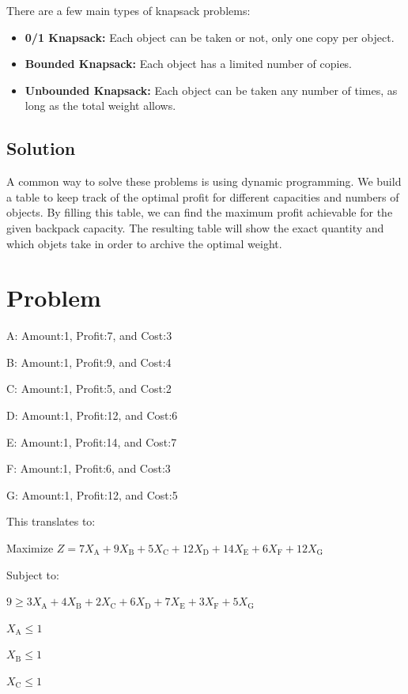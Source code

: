 \documentclass{article}
\begin{document}
There are a few main types of knapsack problems:
\begin{itemize}
  \item \textbf{0/1 Knapsack:} Each object can be taken or not, only one copy per object.
  \item \textbf{Bounded Knapsack:} Each object has a limited number of copies.
  \item \textbf{Unbounded Knapsack:} Each object can be taken any number of times, as long as the total weight allows.
\end{itemize}

\subsection{Solution}
A common way to solve these problems is using dynamic programming. We build a table to keep track of the optimal profit for different capacities and numbers of objects. By filling this table, we can find the maximum profit achievable for the given backpack capacity.
The resulting table will show the exact quantity and which objets take in order to archive the optimal weight.
\section{Problem}

A: Amount:1, Profit:7, and Cost:3

B: Amount:1, Profit:9, and Cost:4

C: Amount:1, Profit:5, and Cost:2

D: Amount:1, Profit:12, and Cost:6

E: Amount:1, Profit:14, and Cost:7

F: Amount:1, Profit:6, and Cost:3

G: Amount:1, Profit:12, and Cost:5




This translates to:

Maximize $Z = 7X_{\text{A}} + 9X_{\text{B}} + 5X_{\text{C}} + 12X_{\text{D}} + 14X_{\text{E}} + 6X_{\text{F}} + 12X_{\text{G}}$



Subject to:

$9 \geq 3X_{\text{A}} + 4X_{\text{B}} + 2X_{\text{C}} + 6X_{\text{D}} + 7X_{\text{E}} + 3X_{\text{F}} + 5X_{\text{G}}$

$X_{\text{A}} \leq 1$

$X_{\text{B}} \leq 1$

$X_{\text{C}} \leq 1$
\end{document}

